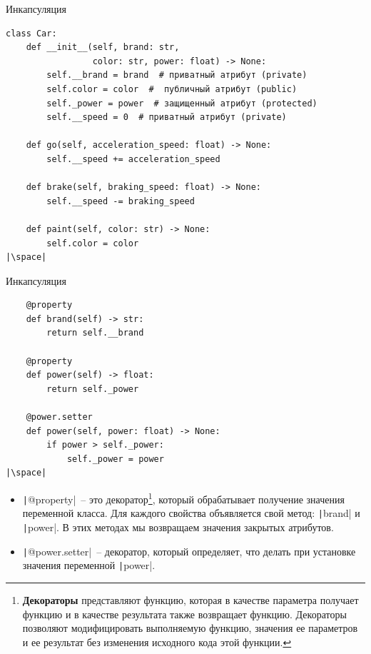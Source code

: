 \documentclass[aspectratio=169, mathserif]{beamer}	%
\begin{document}
\begin{frame}[fragile]{Инкапсуляция}
\scriptsize
\begin{verbatim}
class Car:
    def __init__(self, brand: str,
                 color: str, power: float) -> None:
        self.__brand = brand  # приватный атрибут (private)
        self.color = color  #  публичный атрибут (public)
        self._power = power  # защищенный атрибут (protected)
        self.__speed = 0  # приватный атрибут (private)

    def go(self, acceleration_speed: float) -> None:
        self.__speed += acceleration_speed

    def brake(self, braking_speed: float) -> None:
        self.__speed -= braking_speed

    def paint(self, color: str) -> None:
        self.color = color
|\space|
\end{verbatim}
\vfill
\end{frame}


\begin{frame}[fragile]{Инкапсуляция}
\scriptsize
\begin{verbatim}
    @property
    def brand(self) -> str:
        return self.__brand

    @property
    def power(self) -> float:
        return self._power

    @power.setter
    def power(self, power: float) -> None:
        if power > self._power:
            self._power = power
|\space|
\end{verbatim}
\begin{itemize}
\item \texttt|@property|~-- это декоратор\footnote{\tiny{\textcolor{tpugreen}{\textbf{Декораторы}} представляют функцию, которая в качестве параметра получает функцию и в качестве результата также возвращает функцию. Декораторы позволяют модифицировать выполняемую функцию, значения ее параметров и ее результат без изменения исходного кода этой функции.}}, который обрабатывает получение значения переменной класса. Для каждого свойства объявляется свой метод: \texttt|brand| и \texttt|power|. В этих методах мы возвращаем значения закрытых атрибутов.
\item \texttt|@power.setter|~-- декоратор, который определяет, что делать при установке значения переменной \texttt|power|.
\end{itemize}
\vfill
\end{frame}
\end{document}

